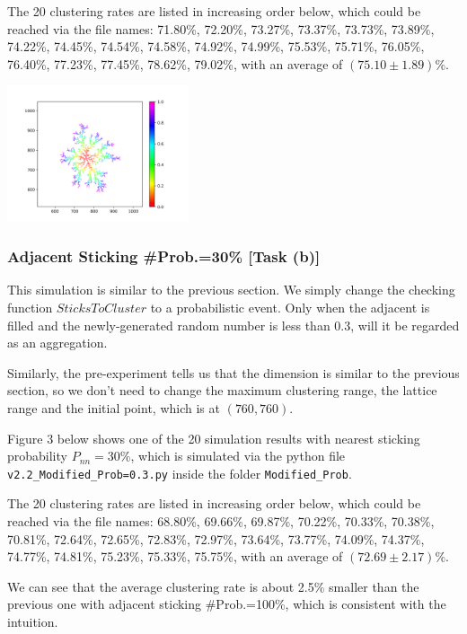 \documentclass[10pt]{article}
\begin{document}
The 20 clustering rates are listed in increasing order below, which could be reached via the file names: 71.80\%, 72.20\%, 73.27\%, 73.37\%, 73.73\%, 73.89\%, 74.22\%, 74.45\%, 74.54\%, 74.58\%, 74.92\%, 74.99\%, 75.53\%, 75.71\%, 76.05\%, 76.40\%, 77.23\%, 77.45\%, 78.62\%, 79.02\%, with an average of $(75.10\pm 1.89)\%$.

\begin{center}
	\includegraphics[width=0.4\textwidth]{Figure_2}
\end{center}

\subsubsection{Adjacent Sticking \#Prob.=30\% [Task (b)]}

This simulation is similar to the previous section. We simply change the checking function $SticksToCluster$ to a probabilistic event. Only when the adjacent is filled and the newly-generated random number is less than 0.3, will it be regarded as an aggregation.

Similarly, the pre-experiment tells us that the dimension is similar to the previous section, so we don't need to change the maximum clustering range, the lattice range and the initial point, which is at $(760,760)$.

Figure 3 below shows one of the 20 simulation results with nearest sticking probability $P_{nn}=30\%$, which is simulated via the python file \texttt{v2.2\_Modified\_Prob=0.3.py} inside the folder \texttt{Modified\_Prob}.

The 20 clustering rates are listed in increasing order below, which could be reached via the file names: 68.80\%, 69.66\%, 69.87\%, 70.22\%, 70.33\%, 70.38\%, 70.81\%, 72.64\%, 72.65\%, 72.83\%, 72.97\%, 73.64\%, 73.77\%, 74.09\%, 74.37\%, 74.77\%, 74.81\%, 75.23\%, 75.33\%, 75.75\%, with an average of $(72.69\pm 2.17)\%$.

We can see that the average clustering rate is about 2.5\% smaller than the previous one with adjacent sticking \#Prob.=100\%, which is consistent with the intuition.
\end{document}

